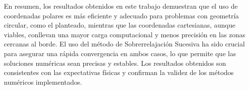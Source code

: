 En resumen, los resultados obtenidos en este trabajo demuestran que el uso de coordenadas polares es más eficiente y adecuado para problemas con geometría circular, como el planteado, mientras que las coordenadas cartesianas, aunque viables, conllevan una mayor carga computacional y menos precisión en las zonas cercanas al borde. El uso del método de Sobrerrelajación Sucesiva ha sido crucial para asegurar una rápida convergencia en ambos casos, lo que permite que las soluciones numéricas sean precisas y estables. Los resultados obtenidos son consistentes con las expectativas físicas y confirman la validez de los métodos numéricos implementados.


